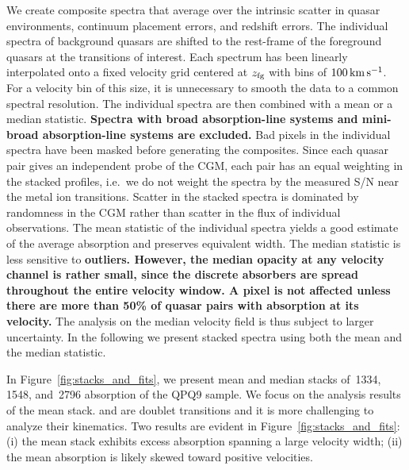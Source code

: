 \documentclass[iop]{emulateapj}
\begin{document}
We create composite spectra that average over the intrinsic scatter in quasar environments,
continuum placement errors, and redshift errors. The individual spectra of background quasars are
shifted to the rest-frame of the foreground quasars at the transitions of interest. Each spectrum
has been linearly interpolated onto a fixed velocity grid centered at $z_{\rm fg}$ with bins of
$100\,{\rm km\,s^{-1}}$. For a velocity bin of this size, it is unnecessary to smooth the data to
a common spectral resolution.
The individual spectra are then combined with a mean or a median
statistic.
{\bf Spectra with broad absorption-line systems and mini-broad absorption-line systems are excluded.}
Bad pixels in the individual spectra have been masked before generating the
composites. Since each quasar pair gives an independent probe of the CGM, each pair has an equal
weighting in the stacked profiles, i.e.\ we do not weight the spectra by the measured S/N near the
metal ion transitions. Scatter in the stacked spectra is dominated by randomness in the CGM rather
than scatter in the flux of individual observations. The mean statistic of the individual spectra
yields a good estimate of the average absorption and preserves equivalent width. The median
statistic is less sensitive to {\bf outliers. However, the median opacity at any velocity channel is
rather small, since the discrete absorbers are spread throughout the entire velocity window.
A pixel is not affected unless there are more than 50\% of quasar pairs with absorption at its
velocity.} The analysis on the median velocity field is thus subject to larger uncertainty. In the
following we present stacked spectra using both the mean and the median statistic.

In Figure~\ref{fig:stacks_and_fits}, we present mean and median stacks of \,1334,
\,1548, and \,2796 absorption of the QPQ9 sample. We focus on the
analysis results of the  mean stack.  and  are doublet transitions
and it is more challenging to analyze their kinematics.
Two results are evident in Figure~\ref{fig:stacks_and_fits}: (i) the mean  stack
exhibits excess absorption spanning a large velocity width; (ii) the mean absorption is likely
skewed toward positive velocities.
\end{document}
